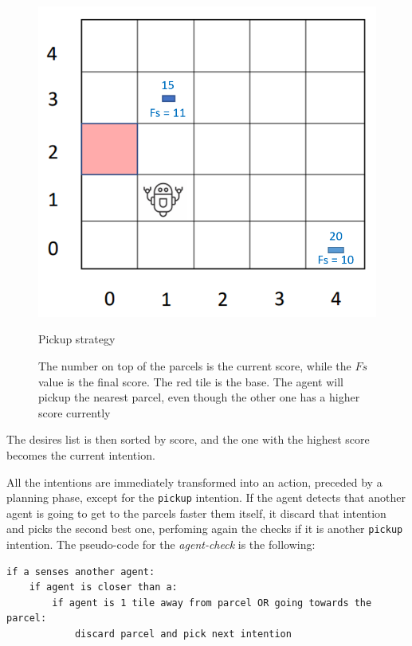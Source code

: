 \begin{figure}
    \centering
    \includegraphics[width=0.9\linewidth]{Images/strategy.png}
    \caption{Pickup strategy}
    \captionsetup{font=footnotesize}
    \caption*{The number on top of the parcels is the current score, while the $Fs$ value is the final score. The red tile is the base. The agent will pickup the nearest parcel, even though the other one has a higher score currently}
    \label{fig:pickup}
\end{figure}

The desires list is then sorted by score, and the one with the highest score becomes the current intention.

All the intentions are immediately transformed into an action, preceded by a planning phase, except for the \texttt{pickup} intention.
If the agent detects that another agent is going to get to the parcels faster them itself, it discard that intention and picks the second best one, perfoming again the checks if it is another \texttt{pickup} intention.
The pseudo-code for the \textit{agent-check} is the following:

\begin{lstlisting}[caption={Opponent agents checks}]
if a senses another agent:
    if agent is closer than a:
        if agent is 1 tile away from parcel OR going towards the parcel:
            discard parcel and pick next intention
\end{lstlisting}



